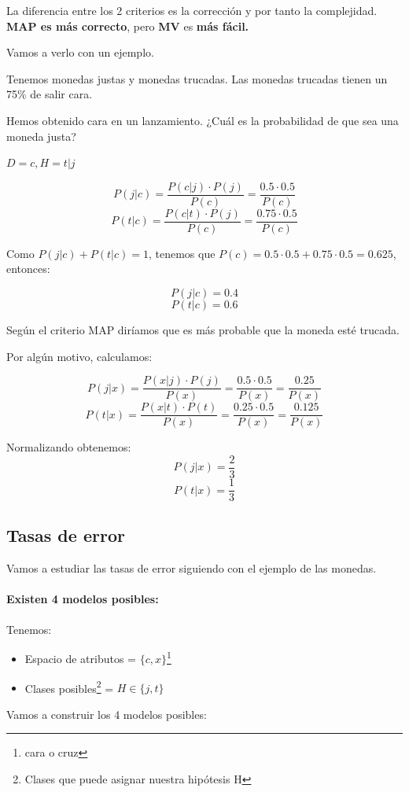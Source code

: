 \documentclass{apuntes}
\begin{document}
La diferencia entre los 2 criterios es la corrección y por tanto la complejidad. \textbf{MAP es más correcto}, pero \textbf{MV} es \textbf{más fácil.}

Vamos a verlo con un ejemplo.

\begin{example}
Tenemos monedas justas y monedas trucadas. Las monedas trucadas tienen un 75\% de salir cara.

Hemos obtenido cara en un lanzamiento. ¿Cuál es la probabilidad de que sea una moneda justa?

$D=c, H=t|j$

\[
P(j|c) = \frac{P(c|j)·P(j)}{P(c)} = \frac{0.5·0.5}{P(c)}
\]
\[
P(t|c) = \frac{P(c|t)·P(j)}{P(c)} = \frac{0.75·0.5}{P(c)}
\]

Como $P(j|c) + P(t|c) = 1$, tenemos que $P(c) = 0.5·0.5 + 0.75·0.5 = 0.625$, entonces:

\label{calculadoAnteriomente1}
\[P(j|c) = 0.4\]
\[P(t|c) = 0.6\]

Según el criterio MAP diríamos que es más probable que la moneda esté trucada.

Por algún motivo, calculamos:

\[P(j|x) = \frac{P(x|j)·P(j)}{P(x)} = \frac{0.5·0.5}{P(x)} = \frac{0.25}{P(x)}\]
\[P(t|x) = \frac{P(x|t)·P(t)}{P(x)} = \frac{0.25·0.5}{P(x)} = \frac{0.125}{P(x)}\]

Normalizando obtenemos:
\label{calculadoAnteriomente2}
\[P(j|x) = \frac{2}{3}\]
\[P(t|x) = \frac{1}{3}\]

\subsection{Tasas de error}

Vamos a estudiar las tasas de error siguiendo con el ejemplo de las monedas.

\paragraph{Existen 4 modelos posibles:}
Tenemos:
\begin{itemize}
\item Espacio de atributos = $\{c,x\}$\footnote{cara o cruz}
\item Clases posibles\footnote{Clases que puede asignar nuestra hipótesis H} = $H\in\{j,t\}$
\end{itemize}

Vamos a construir los 4 modelos posibles:


\end{example}
\end{document}
